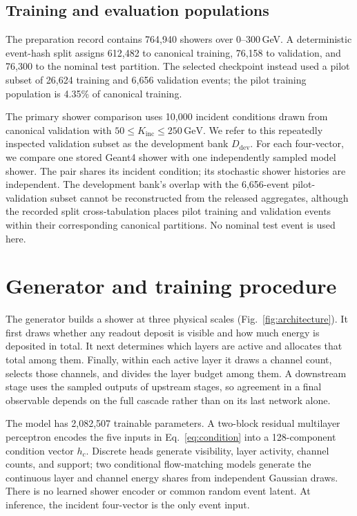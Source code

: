 \documentclass[11pt]{article}
\newcommand{\GeV}{\,\mathrm{GeV}}
\newcommand{\Kinc}{K_{\mathrm{inc}}}
\newcommand{\Ddev}{D_{\mathrm{dev}}}
\begin{document}
\subsection{Training and evaluation populations}

The preparation record contains 764,940 showers over 0--300\,GeV. A deterministic event-hash split assigns 612,482 to canonical training, 76,158 to validation, and 76,300 to the nominal test partition. The selected checkpoint instead used a pilot subset of 26,624 training and 6,656 validation events; the pilot training population is 4.35\% of canonical training.

The primary shower comparison uses 10,000 incident conditions drawn from canonical validation with $50\leq\Kinc\leq250\GeV$. We refer to this repeatedly inspected validation subset as the development bank $\Ddev$. For each four-vector, we compare one stored Geant4 shower with one independently sampled model shower. The pair shares its incident condition; its stochastic shower histories are independent. The development bank's overlap with the 6,656-event pilot-validation subset cannot be reconstructed from the released aggregates, although the recorded split cross-tabulation places pilot training and validation events within their corresponding canonical partitions. No nominal test event is used here.

\section{Generator and training procedure}
\label{sec:model}

The generator builds a shower at three physical scales (Fig.~\ref{fig:architecture}). It first draws whether any readout deposit is visible and how much energy is deposited in total. It next determines which layers are active and allocates that total among them. Finally, within each active layer it draws a channel count, selects those channels, and divides the layer budget among them. A downstream stage uses the sampled outputs of upstream stages, so agreement in a final observable depends on the full cascade rather than on its last network alone.

The model has 2,082,507 trainable parameters. A two-block residual multilayer perceptron encodes the five inputs in Eq.~\eqref{eq:condition} into a 128-component condition vector $h_c$. Discrete heads generate visibility, layer activity, channel counts, and support; two conditional flow-matching models generate the continuous layer and channel energy shares from independent Gaussian draws. There is no learned shower encoder or common random event latent. At inference, the incident four-vector is the only event input.
\end{document}
